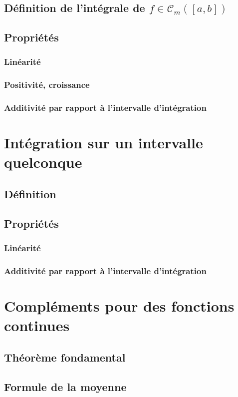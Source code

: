 \documentclass[12pt,a4paper,french]{book}
\begin{document}
		\subsection{Définition de l'intégrale de $f \in \mathcal{C}_m([a,b])$}
		\subsection{Propriétés}
			\subsubsection{Linéarité}
			\subsubsection{Positivité, croissance}
			\subsubsection{Additivité par rapport à l'intervalle d'intégration}
	\section{Intégration sur un intervalle quelconque}
		\subsection{Définition}
		\subsection{Propriétés}
			\subsubsection{Linéarité}
			\subsubsection{Additivité par rapport à l'intervalle d'intégration}
	\section{Compléments pour des fonctions continues}
		\subsection{Théorème fondamental}
		\subsection{Formule de la moyenne}
\end{document}

